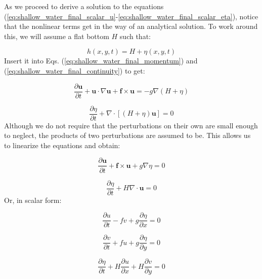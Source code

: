 \documentclass[12pt]{article}
\numberwithin{equation}{section}
\numberwithin{figure}{section}
\numberwithin{table}{section}
\begin{document}
As we proceed to derive a solution to the equations
(\ref{eq:shallow_water_final_scalar_u}-\ref{eq:shallow_water_final_scalar_eta}),
notice that the nonlinear terms get in the way of an analytical solution.
To work around this, we will assume a flat bottom $H$ such that:

\begin{equation}
  h(x, y, t) = H + \eta(x, y, t)
\end{equation}
Insert it into Eqs. (\ref{eq:shallow_water_final_momentum}) and
(\ref{eq:shallow_water_final_continuity}) to get:

\begin{equation}
  \frac{\partial \mathbf{u}}{\partial t} + 
  \mathbf{u} \cdot \nabla \mathbf{u} +
  \mathbf{f} \times \mathbf{u} =
  - g \nabla \left( H + \eta \right)
\end{equation}

\begin{equation}
  \frac{\partial \eta}{\partial t} + \nabla \cdot \left[ (H + \eta) \mathbf{u} \right] = 0
\end{equation}
Although we do not require that the perturbations on their own
are small enough to neglect, the products of two perturbations are assumed to
be.
This allows us to linearize the equations and obtain:

\begin{equation}
  \frac{\partial \mathbf{u}}{\partial t} + 
  \mathbf{f} \times \mathbf{u} +
  g \nabla \eta = 0
\end{equation}

\begin{equation}
  \frac{\partial \eta}{\partial t} + H \nabla \cdot \mathbf{u} = 0
\end{equation}
Or, in scalar form:

\begin{equation}
  \frac{\partial u}{\partial t} - f v + g \frac{\partial \eta}{\partial x} = 0
  \label{eq:swe_linear_u}
\end{equation}

\begin{equation}
  \frac{\partial v}{\partial t} + f u + g \frac{\partial \eta}{\partial y} = 0
  \label{eq:swe_linear_v}
\end{equation}

\begin{equation}
  \frac{\partial \eta}{\partial t} + H \frac{\partial u}{\partial x} + H \frac{\partial v}{\partial y} = 0
  \label{eq:swe_linear_eta}
\end{equation}
\end{document}
